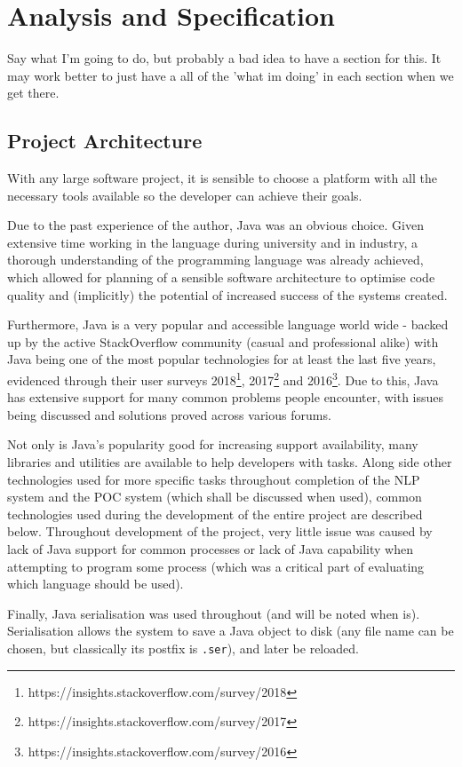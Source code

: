 \section{Analysis and Specification}
Say what I'm going to do, but probably a bad idea to have a section for this. It may work better to just have a all of the 'what im doing' in each section when we get there.

\subsection{Project Architecture}
With any large software project, it is sensible to choose a platform with all the necessary tools available so the developer can achieve their goals. 

Due to the past experience of the author, Java was an obvious choice. Given extensive time working in the language during university and in industry, a thorough understanding of the programming language was already achieved, which allowed for planning of a sensible software architecture to optimise code quality and (implicitly) the potential of increased success of the systems created. 

Furthermore, Java is a very popular and accessible language world wide - backed up by the active StackOverflow community (casual and professional alike) with Java being one of the most popular technologies for at least the last five years, evidenced through their user surveys 2018\footnote{https://insights.stackoverflow.com/survey/2018}, 2017\footnote{https://insights.stackoverflow.com/survey/2017} and 2016\footnote{https://insights.stackoverflow.com/survey/2016}. Due to this, Java has extensive support for many common problems people encounter, with issues being discussed and solutions proved across various forums. 

Not only is Java's popularity good for increasing support availability, many libraries and utilities are available to help developers with tasks. Along side other technologies used for more specific tasks throughout completion of the NLP system and the POC system (which shall be discussed when used), common technologies used during the development of the entire project are described below. Throughout development of the project, very little issue was caused by lack of Java support for common processes or lack of Java capability when attempting to program some process (which was a critical part of evaluating which language should be used). 

Finally, Java serialisation was used throughout (and will be noted when is). Serialisation allows the system to save a Java object to disk (any file name can be chosen, but classically its postfix is \texttt{.ser}), and later be reloaded. 

